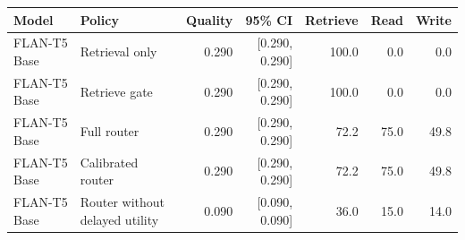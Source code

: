 \begin{tabular}{llrrrrr}
\toprule
Model & Policy & Quality & 95\% CI & Retrieve & Read & Write \\
\midrule
FLAN-T5 Base & Retrieval only & 0.290 & [0.290, 0.290] & 100.0 & 0.0 & 0.0 \\
FLAN-T5 Base & Retrieve gate & 0.290 & [0.290, 0.290] & 100.0 & 0.0 & 0.0 \\
FLAN-T5 Base & Full router & 0.290 & [0.290, 0.290] & 72.2 & 75.0 & 49.8 \\
FLAN-T5 Base & Calibrated router & 0.290 & [0.290, 0.290] & 72.2 & 75.0 & 49.8 \\
FLAN-T5 Base & Router without delayed utility & 0.090 & [0.090, 0.090] & 36.0 & 15.0 & 14.0 \\
\bottomrule
\end{tabular}
